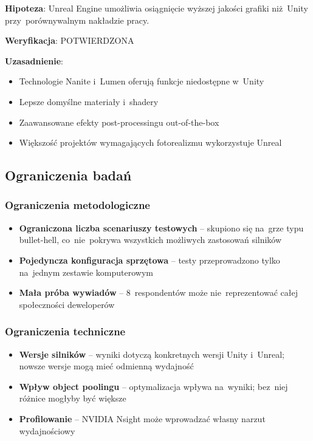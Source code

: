 \textbf{Hipoteza}: Unreal Engine umożliwia osiągnięcie wyższej jakości grafiki niż~Unity przy~porównywalnym nakładzie pracy.

\textbf{Weryfikacja}: POTWIERDZONA

\textbf{Uzasadnienie}:
\begin{itemize}
    \item Technologie Nanite i~Lumen oferują funkcje niedostępne w~Unity
    \item Lepsze domyślne materiały i~shadery
    \item Zaawansowane efekty post-processingu out-of-the-box
    \item Większość projektów wymagających fotorealizmu wykorzystuje Unreal
\end{itemize}

\subsection{Ograniczenia badań}

\subsubsection{Ograniczenia metodologiczne}

\begin{itemize}
    \item \textbf{Ograniczona liczba scenariuszy testowych} -- skupiono się na~grze typu bullet-hell, co~nie~pokrywa wszystkich możliwych zastosowań silników
    \item \textbf{Pojedyncza konfiguracja sprzętowa} -- testy przeprowadzono tylko na~jednym zestawie komputerowym
    \item \textbf{Mała próba wywiadów} -- 8~respondentów może nie~reprezentować całej społeczności deweloperów
\end{itemize}

\subsubsection{Ograniczenia techniczne}

\begin{itemize}
    \item \textbf{Wersje silników} -- wyniki dotyczą konkretnych wersji Unity i~Unreal; nowsze wersje mogą mieć odmienną wydajność
    \item \textbf{Wpływ object poolingu} -- optymalizacja wpływa na~wyniki; bez~niej różnice mogłyby być większe
    \item \textbf{Profilowanie} -- NVIDIA Nsight może wprowadzać własny narzut wydajnościowy
\end{itemize}

